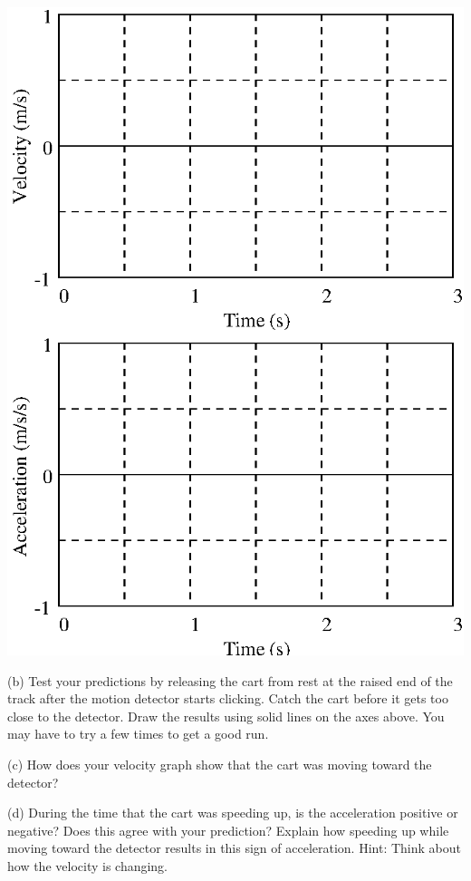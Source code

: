 {\par\centering \includegraphics{slowing/slowing_fig1.eps} \par}

(b) Test your predictions by releasing the cart from rest at the raised end of the track after the motion detector starts clicking. Catch the cart before it gets too close to the detector.  
Draw the results using solid lines on the axes above. You may have to try a
few times to get a good run.

(c) How does your velocity graph show that the cart was moving toward the detector? 
\answerspace{20mm}

(d) During the time that the cart was speeding up, is the acceleration positive
or negative? Does this agree with your prediction? Explain how speeding up while
moving toward the detector results in this sign of acceleration. Hint: Think
about how the velocity is changing.
\answerspace{20mm}

